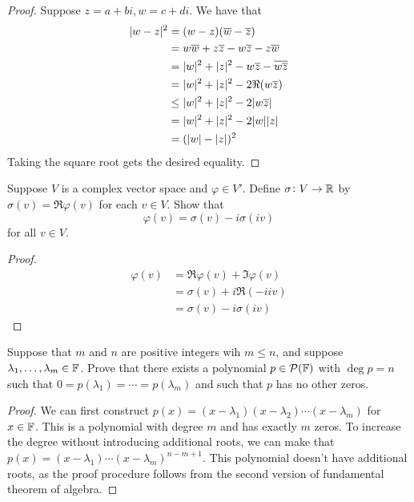 \documentclass{extarticle}
\begin{document}
\begin{proof}
Suppose \(z = a + b i, w = c + d i\). We have that 
\begin{align*}
    |w - z|^2 
    &= (w - z) (\overline{w} - \overline{z}) \\ 
    &= w\overline{w} + z\overline{z} - w\overline{z} - z\overline{w} \\ 
    &= |w|^2 + |z|^2 - w\overline{z} - \overline{w \overline{z}} \\ 
    &= |w|^2 + |z|^2 - 2\Re(w\overline{z}) \\ 
    &\leq |w|^2 + |z|^2 - 2|w\overline{z}| \\ 
    &= |w|^2 + |z|^2 - 2|w||z| \\ 
    &= (|w| - |z|)^2
\end{align*}
Taking the square root gets the desired equality. 
\end{proof}


\begin{problem}{3}
    Suppose \(V\) is a complex vector space and \(\varphi \in V'\). Define 
    \(\sigma \colon V \to \mathbb{R}\) by \(\sigma(v) = \Re \varphi(v)\) for each \(v \in V\). Show that 
    \[\varphi(v)  =\sigma(v) - i \sigma(iv)\]
    for all \(v \in V\). 
\end{problem}

\begin{proof}
\begin{align*}
    \varphi(v) 
    &= \Re \varphi(v) + \Im \varphi(v)  \\ 
    &= \sigma(v) + i \Re(- ii v) \\ 
    &= \sigma(v) - i \sigma(iv)
\end{align*}
\end{proof}


\begin{problem}{6}
    Suppose that \(m\) and \(n\) are positive integers wih \(m \leq n\), and suppose 
    \(\lambda_1, \ldots, \lambda_m \in \mathbb{F}\). Prove that there exists a polynomial 
    \(p \in \mathcal{P}(\mathbb{F})\) with \(\deg p = n\) such that \(0 = p(\lambda_1) = \cdots = p(\lambda_m)\)
    and such that \(p\) has no other zeros. 
\end{problem}

\begin{proof}
We can first construct \(p(x) = (x - \lambda_1)(x - \lambda_2)\cdots(x-\lambda_m)\) for \(x \in \mathbb{F}\). 
This is a polynomial with degree \(m\) and has exactly \(m\) zeros. To increase the degree without 
introducing additional roots, we can make that \(p(x) = (x - \lambda_1)\cdots(x - \lambda_m)^{n-m+1}\). 
This polynomial doesn't have additional roots, as the proof procedure follows from the second 
version of fundamental theorem of algebra. 
\end{proof}
\end{document}

